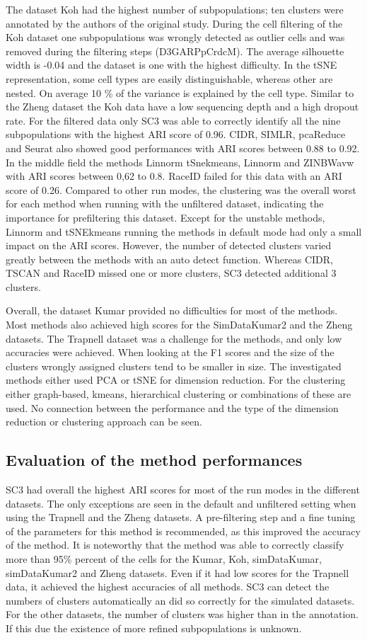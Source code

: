 \documentclass[12pt, a4paper]{article}\usepackage[]{graphicx}\usepackage[]{color}
\begin{document}
The dataset Koh had the highest number of subpopulations;  ten clusters were annotated by the authors of the original study. During the cell filtering of the Koh dataset one subpopulations was wrongly detected as outlier cells and was removed during the filtering steps (D3GARPpCrdcM). The average silhouette width is -0.04 and the dataset is one with the highest difficulty. In the tSNE representation, some cell types are easily distinguishable, whereas other are nested. On average 10 \% of the variance is explained by the cell type. Similar to the Zheng dataset the Koh data have a low sequencing depth and a high dropout rate.  For the filtered data only SC3 was able to correctly identify all the nine subpopulations with the highest ARI score of 0.96. CIDR, SIMLR, pcaReduce and Seurat also showed good performances with ARI scores between 0.88 to 0.92. In the middle field the methods Linnorm tSnekmeans, Linnorm and ZINBWavw with ARI scores between 0,62 to 0.8. RaceID failed for this data with an ARI score of 0.26. Compared to other run modes, the clustering was the overall worst for each method when running with the unfiltered dataset, indicating the importance for prefiltering this dataset. Except for the unstable methods, Linnorm and tSNEkmeans running the methods in default mode had only a small impact on the ARI scores. However, the number of detected clusters varied greatly between the methods with an auto detect function. Whereas CIDR, TSCAN and RaceID missed one or more clusters, SC3 detected additional 3 clusters.

Overall, the dataset Kumar provided no difficulties for most of the methods. Most methods also achieved high scores for the SimDataKumar2 and the Zheng datasets. The Trapnell dataset was a challenge for the methods, and only low accuracies were achieved. When looking at the F1 scores and the size of the clusters wrongly assigned clusters tend to be smaller in size.
The investigated methods either used PCA or tSNE for dimension reduction. For the clustering either graph-based, kmeans, hierarchical clustering or combinations of these are used. No connection between the performance and the type of the dimension reduction or clustering approach can be seen.
\subsection{Evaluation of the method performances}
SC3 had overall the highest ARI scores for most of the run modes in the different datasets. The only exceptions are seen in the default and unfiltered setting when using the Trapnell and the Zheng datasets. A pre-filtering step and a fine tuning of the parameters for this method is recommended, as this improved the accuracy of the method. It is noteworthy that the method was able to correctly classify more than 95\% percent of the cells for the Kumar, Koh, simDataKumar, simDataKumar2 and Zheng datasets. Even if it had low scores for the Trapnell data, it achieved the highest accuracies of all methods. SC3 can detect the numbers of clusters automatically an did so correctly for the simulated datasets. For the other datasets, the number of clusters was higher than in the annotation. If this due the existence of more refined subpopulations is unknown. 
\end{document}
